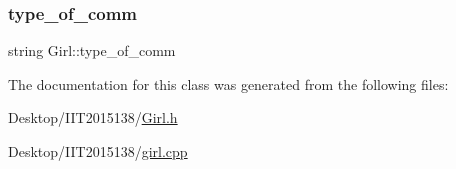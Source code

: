 \mbox{\label{classGirl_ad1688de7d21b7c60292f4e7716a4653d}} 
\subsubsection{\texorpdfstring{type\+\_\+of\+\_\+comm}{type\_of\_comm}}
{\footnotesize\ttfamily string Girl\+::type\+\_\+of\+\_\+comm\hspace{0.3cm}{\ttfamily [private]}}



The documentation for this class was generated from the following files\+:\begin{DoxyCompactItemize}
\item 
Desktop/\+I\+I\+T2015138/\hyperlink{Girl_8h}{Girl.\+h}\item 
Desktop/\+I\+I\+T2015138/\hyperlink{girl_8cpp}{girl.\+cpp}\end{DoxyCompactItemize}
